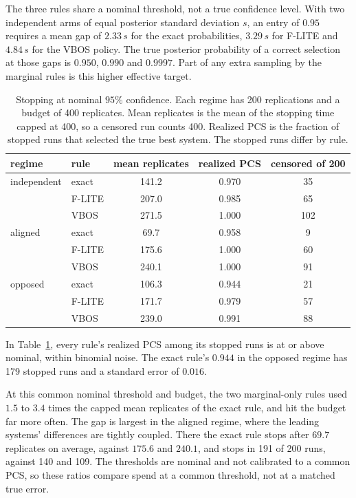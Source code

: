 \documentclass[11pt]{article}
\begin{document}
The three rules share a nominal threshold, not a true confidence
level. With two independent arms of equal posterior standard
deviation $s$, an entry of $0.95$ requires a mean gap of $2.33\,s$ for the exact probabilities, $3.29\,s$ for F-LITE and $4.84\,s$ for the VBOS
policy. The true posterior probability of a correct selection at
those gaps is $0.950$, $0.990$ and $0.9997$. Part of any extra
sampling by the marginal rules is this higher effective target.

\begin{table}[h]
\centering
\begin{tabular}{llccc}
\toprule
regime & rule & mean replicates & realized PCS & censored of 200 \\
\midrule
independent & exact & 141.2 & 0.970 & 35 \\
            & F-LITE & 207.0 & 0.985 & 65 \\
            & VBOS  & 271.5 & 1.000 & 102 \\
\addlinespace
aligned     & exact & \phantom{0}69.7 & 0.958 & \phantom{0}9 \\
            & F-LITE & 175.6 & 1.000 & 60 \\
            & VBOS  & 240.1 & 1.000 & 91 \\
\addlinespace
opposed     & exact & 106.3 & 0.944 & 21 \\
            & F-LITE & 171.7 & 0.979 & 57 \\
            & VBOS  & 239.0 & 0.991 & 88 \\
\bottomrule
\end{tabular}
\caption{Stopping at nominal $95\%$ confidence. Each regime has 200
replications and a budget of 400 replicates. Mean replicates is the
mean of the stopping time capped at 400, so a censored run counts 400.
Realized PCS is the fraction of stopped runs that selected the true
best system. The stopped runs differ by rule.}
\label{tab:stopping}
\end{table}

In Table~\ref{tab:stopping}, every rule's realized PCS among its
stopped runs is at or above nominal, within binomial noise. The exact
rule's $0.944$ in the opposed regime has 179 stopped runs and a
standard error of $0.016$.

At this common nominal threshold and budget, the two marginal-only
rules used $1.5$ to $3.4$ times the capped mean replicates of the
exact rule, and hit the budget far more often. The gap is largest in
the aligned regime, where the leading systems' differences are
tightly coupled. There the exact rule stops after $69.7$ replicates on
average, against $175.6$ and $240.1$, and stops in 191 of 200 runs,
against 140 and 109. The thresholds are nominal and not calibrated
to a common PCS, so these ratios compare spend at a common threshold,
not at a matched true error.
\end{document}
